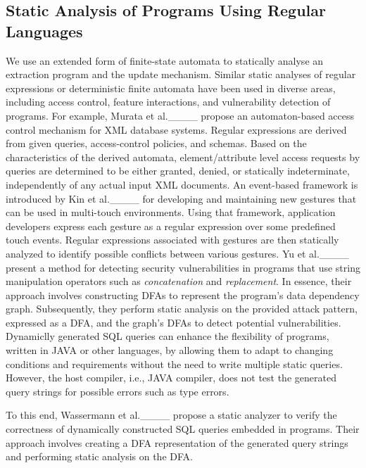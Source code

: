 \subsection{Static Analysis of Programs Using Regular Languages}
 We use an extended form of finite-state automata to statically analyse an extraction program and the update mechanism. Similar static analyses of regular expressions or deterministic finite automata   have been used in diverse areas, including  access control, feature interactions, and vulnerability detection of programs. For example, Murata et al.____ propose an automaton-based access control mechanism for XML database systems. Regular expressions are derived  from given queries, access-control policies, and  schemas. Based on the characteristics of the derived automata, element/attribute level access requests  by  queries are determined to be either  granted, denied, or statically indeterminate, independently of any actual input XML documents. An event-based framework is introduced by Kin et al.____ for developing and maintaining new gestures that can be used in multi-touch environments. Using that framework, application developers express each gesture as a regular expression over some predefined touch events. Regular expressions associated with  gestures are then statically analyzed to identify possible conflicts between various gestures. Yu et al.____ present a method for detecting security vulnerabilities in programs that use string manipulation operators such as \emph{concatenation} and \emph{replacement}. In essence, their approach involves constructing DFAs to represent the program's data dependency graph. Subsequently, they perform static analysis on the provided attack pattern, expressed as a DFA, and the graph's DFAs to detect potential vulnerabilities.
 Dynamiclly generated SQL queries can enhance the flexibility of programs, written in  JAVA or other languages,  by allowing them to adapt to changing conditions and requirements without the need to write multiple static queries. However, the host compiler, i.e., JAVA compiler,  does not test the generated query strings for possible errors such as type errors.

 To this end, Wassermann et al.____ propose a static analyzer to verify the correctness of dynamically constructed SQL queries embedded in programs. Their approach involves creating a DFA representation of the generated query strings and   performing static analysis on the  DFA.